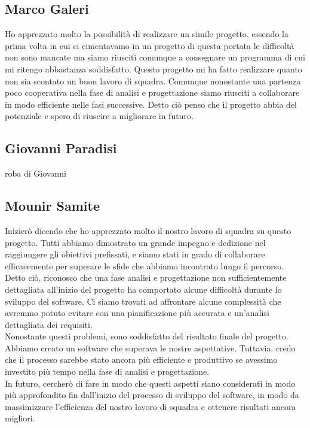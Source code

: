 \documentclass[a4paper,12pt]{report}
\begin{document}
\subsection*{Marco Galeri}
Ho apprezzato molto la possibilità di realizzare un simile progetto, essendo la prima volta in cui ci cimentavamo in un progetto di questa portata le difficoltà non sono mancate ma siamo riusciti comunque a consegnare un programma di cui mi ritengo abbastanza soddisfatto.
 Questo progetto mi ha fatto realizzare quanto non sia scontato un buon lavoro di squadra.
 Comunque nonostante una partenza poco cooperativa nella fase di analisi e progettazione siamo riusciti a collaborare in modo efficiente nelle fasi successive.
 Detto ciò penso che il progetto abbia del potenziale e spero di riuscire a migliorare in futuro.
\subsection*{Giovanni Paradisi}
roba di Giovanni
\subsection*{Mounir Samite}
Inizierò dicendo che ho apprezzato molto il nostro lavoro di squadra su questo progetto. Tutti abbiamo dimostrato un grande impegno e dedizione nel raggiungere gli obiettivi prefissati, e siamo stati in grado di collaborare efficacemente per superare le sfide che abbiamo incontrato lungo il percorso.
\\
Detto ciò, riconosco che una fase analisi e progettazione non sufficientemente dettagliata all'inizio del progetto ha comportato alcune difficoltà durante lo sviluppo del software. Ci siamo trovati ad affrontare alcune complessità che avremmo potuto evitare con una pianificazione più accurata e un'analisi dettagliata dei requisiti.
\\
Nonostante questi problemi, sono soddisfatto del risultato finale del progetto. Abbiamo creato un software che superava le nostre aspettative. Tuttavia, credo che il processo sarebbe stato ancora più efficiente e produttivo se avessimo investito più tempo nella fase di analisi e progettazione.
\\
In futuro, cercherò di fare in modo che questi aspetti siano considerati in modo più approfondito fin dall'inizio del processo di sviluppo del software, in modo da massimizzare l'efficienza del nostro lavoro di squadra e ottenere risultati ancora migliori.


\end{document}
